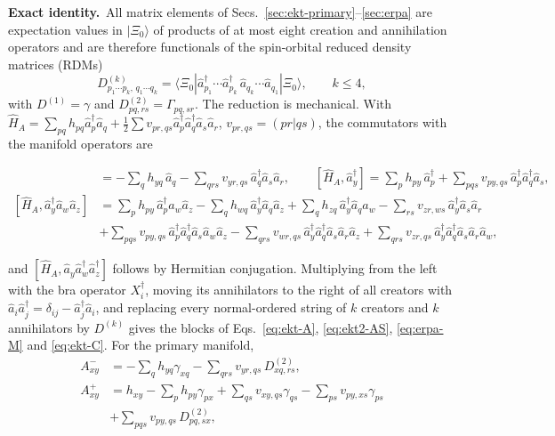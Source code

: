 \documentclass[aip,jcp,reprint,noshowkeys,superscriptaddress]{revtex4-1}
\newcommand{\Exact}{\textbf{Exact identity.}\ }
\begin{document}
\Exact All matrix elements of Secs.~\ref{sec:ekt-primary}--\ref{sec:erpa}
are expectation values in $|\Xi_0\rangle$ of products of at most eight
creation and annihilation operators and are therefore functionals of the
spin-orbital reduced density matrices (RDMs)
\begin{equation}
  D^{(k)}_{p_1\cdots p_k,\,q_1\cdots q_k}
  =\langle\Xi_0|\hat a_{p_1}^\dagger\cdots\hat a_{p_k}^\dagger\,
  \hat a_{q_k}\cdots\hat a_{q_1}|\Xi_0\rangle ,\qquad k\le4 ,
  \label{eq:rdm-def}
\end{equation}
with $D^{(1)}=\gamma$ and $D^{(2)}_{pq,rs}=\Gamma_{pq,sr}$.  The reduction
is mechanical.  With
$\hat H_A=\sum_{pq}h_{pq}\hat a_p^\dagger\hat a_q+\tfrac12\sum v_{pr,qs}\hat a_p^\dagger\hat a_q^\dagger\hat a_s\hat a_r$,
$v_{pr,qs}=(pr|qs)$, the commutators with the manifold operators are
\begin{widetext}
\begin{align}
  [\hat H_A,\hat a_y]&=-\sum_qh_{yq}\,\hat a_q-\sum_{qrs}v_{yr,qs}\,\hat a_q^\dagger\hat a_s\hat a_r ,
  \qquad
  [\hat H_A,\hat a_y^\dagger]=\sum_ph_{py}\,\hat a_p^\dagger+\sum_{pqs}v_{py,qs}\,\hat a_p^\dagger\hat a_q^\dagger\hat a_s ,
  \label{eq:comm-1h}\\
  [\hat H_A,\hat a_y^\dagger\hat a_w\hat a_z]&=\sum_ph_{py}\,\hat a_p^\dagger\hat a_w\hat a_z
  -\sum_qh_{wq}\,\hat a_y^\dagger\hat a_q\hat a_z+\sum_qh_{zq}\,\hat a_y^\dagger\hat a_q\hat a_w
  -\sum_{rs}v_{zr,ws}\,\hat a_y^\dagger\hat a_s\hat a_r
  \nonumber\\
  &+\sum_{pqs}v_{py,qs}\,\hat a_p^\dagger\hat a_q^\dagger\hat a_s\hat a_w\hat a_z
  -\sum_{qrs}v_{wr,qs}\,\hat a_y^\dagger\hat a_q^\dagger\hat a_s\hat a_r\hat a_z
  +\sum_{qrs}v_{zr,qs}\,\hat a_y^\dagger\hat a_q^\dagger\hat a_s\hat a_r\hat a_w ,
  \label{eq:comm-2h1p}
\end{align}
\end{widetext}
and $[\hat H_A,\hat a_y\hat a_w^\dagger\hat a_z^\dagger]$ follows by
Hermitian conjugation.  Multiplying from the left with the bra operator
$X_i^\dagger$, moving its annihilators to the right of all creators with
$\hat a_i\hat a_j^\dagger=\delta_{ij}-\hat a_j^\dagger\hat a_i$, and
replacing every normal-ordered string of $k$ creators and $k$
annihilators by $D^{(k)}$ gives the blocks of
Eqs.~\eqref{eq:ekt-A}, \eqref{eq:ekt2-AS}, \eqref{eq:erpa-M} and
\eqref{eq:ekt-C}.  For the primary manifold,
\begin{align}
  A^-_{xy}&=-\sum_qh_{yq}\gamma_{xq}-\sum_{qrs}v_{yr,qs}\,D^{(2)}_{xq,rs},
  \label{eq:Aminus-rdm}\\
  A^+_{xy}&=h_{xy}-\sum_ph_{py}\gamma_{px}+\sum_{qs}v_{xy,qs}\gamma_{qs}
  -\sum_{ps}v_{py,xs}\gamma_{ps}
  \nonumber\\
  &+\sum_{pqs}v_{py,qs}\,D^{(2)}_{pq,sx},
  \label{eq:Aplus-rdm}
\end{align}
\end{document}
